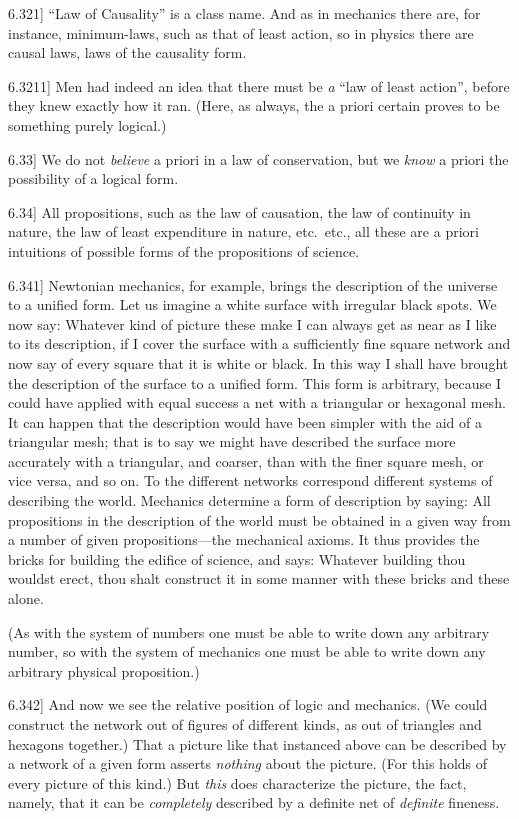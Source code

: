\documentclass[12pt,oneside]{book}[2007/10/19]
\newcommand{\PropositionE}[2]{%
  \item[\phantomsection\label{PropE:#1}\PropGRef{#1}] #2%
}
\newcommand{\PropGRef}[1]{\hyperref[PropG:#1]{#1}}
\begin{document}
\begin{propositions}
\PropositionE{6.321}
{``Law of Causality'' is a class name. And as
in mechanics there are, for instance, minimum-laws,
such as that of least action, so in physics
there are causal laws, laws of the causality
form.}


\PropositionE{6.3211}
{Men had indeed an idea that there must be
\emph{a} ``law of least action'', before they knew
exactly how it ran. (Here, as always, the a
priori certain proves to be something purely
logical.)}


\PropositionE{6.33}
{We do not \emph{believe} a priori in a law of conservation,
but we \emph{know} a priori the possibility of
a logical form.}


\PropositionE{6.34}
{All propositions, such as the law of causation,
the law of continuity in nature, the law of least
expenditure in nature, etc.\ etc., all these are
a priori intuitions of possible forms of the propositions
of science.}


\PropositionE{6.341}
{Newtonian mechanics, for example, brings the
description of the universe to a unified form.
Let us imagine a white surface with irregular
black spots. We now say: Whatever kind of
picture these make I can always get as near as
I like to its description, if I cover the surface
with a sufficiently fine square network and now
say of every square that it is white or black.
In this way I shall have brought the description
of the surface to a unified form. This form is
arbitrary, because I could have applied with equal
success a net with a triangular or hexagonal
mesh. It can happen that the description would
have been simpler with the aid of a triangular
mesh; that is to say we might have described
the surface more accurately with a triangular,
and coarser, than with the finer square mesh, or
vice versa, and so on. To the different networks
correspond different systems of describing the
world. Mechanics determine a form of description
by saying: All propositions in the description
of the world must be obtained in a given
way from a number of given propositions---the
mechanical axioms. It thus provides the bricks
for building the edifice of science, and says:
Whatever building thou wouldst erect, thou shalt
construct it in some manner with these bricks
and these alone.

(As with the system of numbers one must be
able to write down any arbitrary number, so
with the system of mechanics one must be able
to write down any arbitrary physical proposition.)}


\PropositionE{6.342}
{And now we see the relative position of logic
and mechanics. (We could construct the network
out of figures of different kinds, as out of
triangles and hexagons together.) That a picture
like that instanced above can be described by a
network of a given form asserts \emph{nothing} about
the picture. (For this holds of every picture of
this kind.) But \emph{this} does characterize the picture,
the fact, namely, that it can be \emph{completely} described
by a definite net of \emph{definite} fineness.

}
\end{propositions}
\end{document}
